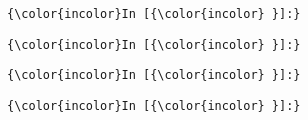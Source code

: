 \documentclass[11pt]{article}
\begin{document}
    \begin{Verbatim}[commandchars=\\\{\}]
{\color{incolor}In [{\color{incolor} }]:} 
\end{Verbatim}

    \begin{Verbatim}[commandchars=\\\{\}]
{\color{incolor}In [{\color{incolor} }]:} 
\end{Verbatim}

    \begin{Verbatim}[commandchars=\\\{\}]
{\color{incolor}In [{\color{incolor} }]:} 
\end{Verbatim}

    \begin{Verbatim}[commandchars=\\\{\}]
{\color{incolor}In [{\color{incolor} }]:} 
\end{Verbatim}


    
    
    
    
\end{document}
